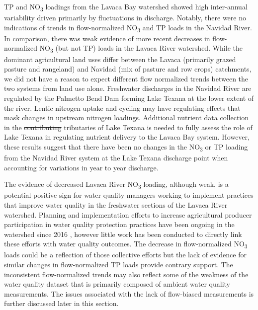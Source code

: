 \documentclass[fleqn,10pt,lineno]{wlpeerj} %
\providecommand{\DIFdeltex}[1]{{\protect\color{red}\sout{#1}}}                      %
\providecommand{\DIFdelbegin}{} %
\providecommand{\DIFdelend}{} %
\providecommand{\DIFdel}[1]{\texorpdfstring{\DIFdeltex{#1}}{}} %
\begin{document}
TP and NO\textsubscript{3} loadings from the Lavaca Bay watershed showed
high inter-annual variability driven primarily by fluctuations in
discharge. Notably, there were no indications of trends in
flow-normalized NO\textsubscript{3} and TP loads in the Navidad River.
In comparison, there was weak evidence of more recent decreases in
flow-normalized NO\textsubscript{3} (but not TP) loads in the Lavaca
River watershed. While the dominant agricultural land uses differ
between the Lavaca (primarily grazed pasture and rangeland) and Navidad
(mix of pasture and row crops) catchments, we did not have a reason to
expect different flow normalized trends between the two systems from
land use alone. Freshwater discharges in the Navidad River are regulated
by the Palmetto Bend Dam forming Lake Texana at the lower extent of the
river. Lentic nitrogen uptake and cycling may have regulating effects
that mask changes in upstream nitrogen loadings. Additional nutrient
data collection in the \DIFdelbegin \DIFdel{contributing }\DIFdelend tributaries of Lake Texana is needed to fully
assess the role of Lake Texana in regulating nutrient delivery to the
Lavaca Bay system. However, these results suggest that there have been
no changes in the NO\textsubscript{3} or TP loading from the Navidad
River system at the Lake Texana discharge point when accounting for
variations in year to year discharge.

The evidence of decreased Lavaca River NO\textsubscript{3} loading,
although weak, is a potential positive sign for water quality managers
working to implement practices that improve water quality in the
freshwater sections of the Lavaca River watershed. Planning and
implementation efforts to increase agricultural producer participation
in water quality protection practices have been ongoing in the watershed
since 2016
\autocite{schrammLavacaRiverWatershed2018,bertholdDirectMailingEducation2021},
however little work has been conducted to directly link these efforts
with water quality outcomes. The decrease in flow-normalized
NO\textsubscript{3} loads could be a reflection of those collective
efforts but the lack of evidence for similar changes in flow-normalized
TP loads provide contrary support. The inconsistent flow-normalized
trends may also reflect some of the weakness of the water quality
dataset that is primarily composed of ambient water quality
measurements. The issues associated with the lack of flow-biased
measurements is further discussed later in this section.
\end{document}
